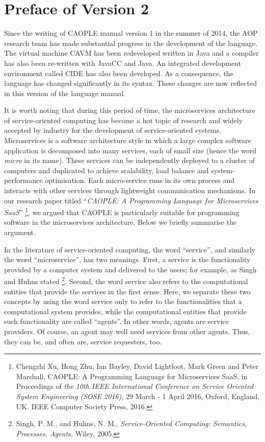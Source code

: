 
\chapter*{Preface of Version 2}

Since the writing of CAOPLE manual version 1 in the summer of 2014, 
the AOP research team has made substantial progress in the development of the 
language. The virtual machine CAVM has been redeveloped written in Java and 
a compiler has also been re-written with JavaCC and Java. An integrated development 
environment called CIDE has also been developed. As a consequence, the language has 
changed significantly in its syntax. These changes are now reflected in this version of the
language manual. 

It is worth noting that during this period of time, the microservices architecture of service-oriented computing 
has become a hot topic of research and widely accepted by industry for the development of service-oriented systems. 
Microservices is a software architecture style in which a large complex software application is decomposed into many services, each of small size (hence the word \emph{micro} in its name). These services can be independently deployed to a cluster of computers and duplicated to achieve scalability, load balance and system-performance optimisation. Each micro-service runs in its own process and interacts with other services through lightweight communication mechanisms. In our research paper titled ``\emph{CAOPLE: A Programming Language for Microservices SaaS}'' \footnote{Chengzhi Xu, Hong Zhu, Ian Bayley, David Lightfoot, Mark Green and Peter Marshall, CAOPLE: A Programming Language for Microservices SaaS, in Proceedings of \emph{the 10th IEEE International Conference on Service Oriented System Engineering (SOSE 2016)}, 29 March - 1 April 2016, Oxford, England, UK.  IEEE Computer Society Press, 2016.}, we argued that CAOPLE is particularly suitable for programming software in the microservices architecture. Below we briefly summarise the argument. 

In the literature of service-oriented computing, the word ``service'', and similarly the word ``microservice'', has two meanings. First, a service is the functionality provided by a computer system and delivered to the users; for example, as Singh and Huhns stated \footnote{Singh, P. M., and Huhns, N. M.,  \emph{Service-Oriented Computing: Semantics, Processes, Agents.} Wiley, 2005.}. Second, the word service also refers to the computational entities that provide the services in the first sense. Here, we separate these two concepts by using the word service only to refer to the functionalities that a computational system provides, while the computational entities that provide such functionality are called ``agents''. In other words, agents are service providers. Of course, an agent may well need services from other agents. Thus, they can be, and often are, service requesters, too. 


